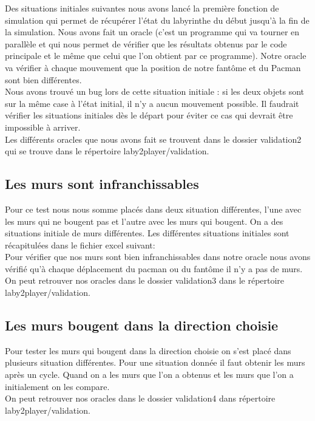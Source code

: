 Des situations initiales suivantes nous avons lancé la première fonction de simulation qui permet de récupérer l'état du labyrinthe du début jusqu'à la fin de la simulation. Nous avons fait un oracle (c'est un programme qui va tourner en parallèle et qui nous permet de vérifier que les résultats obtenus par le code principale et le même que celui que l'on obtient par ce programme). Notre oracle va vérifier à chaque mouvement que la position de notre fantôme et du Pacman sont bien différentes.\\

Nous avons trouvé un bug lors de cette situation initiale : si les deux objets sont sur la même case à l'état initial, il n'y a aucun mouvement possible. Il faudrait vérifier les situations initiales dès le départ pour éviter ce cas qui devrait être impossible à arriver.\\

Les différents oracles que nous avons fait se trouvent dans le dossier validation2 qui se trouve dans le répertoire laby2player/validation.\\


\subsection{Les murs sont infranchissables}
Pour ce test nous nous somme placés dans deux situation différentes, l'une avec les murs qui ne bougent pas et l'autre avec les murs qui bougent. On a des situations initiale de murs différentes. Les différentes situations initiales sont récapitulées dans le fichier excel suivant:\\
Pour vérifier que nos murs sont bien infranchissables dans notre oracle nous avons vérifié qu'à chaque déplacement du pacman ou du fantôme il n'y a pas de murs. On peut retrouver nos oracles dans le dossier validation3 dans le répertoire laby2player/validation.\\


\subsection{Les murs bougent dans la direction choisie}
Pour tester les murs qui bougent dans la direction choisie on s'est placé dans plusieurs situation différentes. Pour une situation donnée il faut obtenir les murs après un cycle. Quand on a les murs que l'on a obtenus et les murs que l'on a initialement on les compare.\\
On peut retrouver nos oracles dans le dossier validation4 dans répertoire laby2player/validation.\\
 

